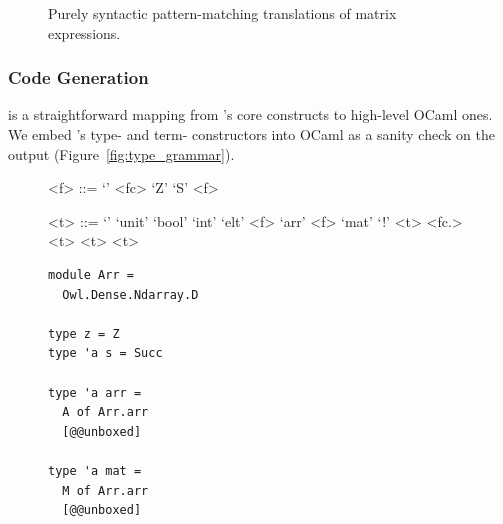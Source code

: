 \begin{figure}[t]
\caption{Purely syntactic pattern-matching translations of
    matrix expressions.}\label{fig:lang_matexp}
\end{figure}

\subsubsection{Code Generation} is a straightforward mapping from \lang's core
constructs to high-level OCaml ones. We embed \lang's type- and term-
constructors into OCaml as a sanity check on the output
(Figure~\ref{fig:type_grammar}).

\begin{figure}[t]
    \centering
    \begin{minipage}{.3\textwidth}
        \centering
        \begin{grammar}
            <f> ::= `'
            \alt <fc>
            \alt `Z'
            \alt `S' <f>

            <t> ::= `'
            \alt `unit'
            \alt `bool'
            \alt `int'
            \alt `elt'
            \alt <f> `arr'
            \alt <f> `mat'
            \alt `!' <t>
            \alt \synt{$\forall$} <fc.> <t>
            \alt <t> \lit{$\otimes$} 
            \alt <t> \lit{$\multimap$} 
        \end{grammar}
    \end{minipage}
    \begin{minipage}{.3\textwidth}
        \centering
        \begin{verbatim}
module Arr =
  Owl.Dense.Ndarray.D

type z = Z
type 'a s = Succ

type 'a arr =
  A of Arr.arr
  [@@unboxed]

type 'a mat =
  M of Arr.arr
  [@@unboxed]


\end{verbatim}
\end{minipage}
\end{figure}
